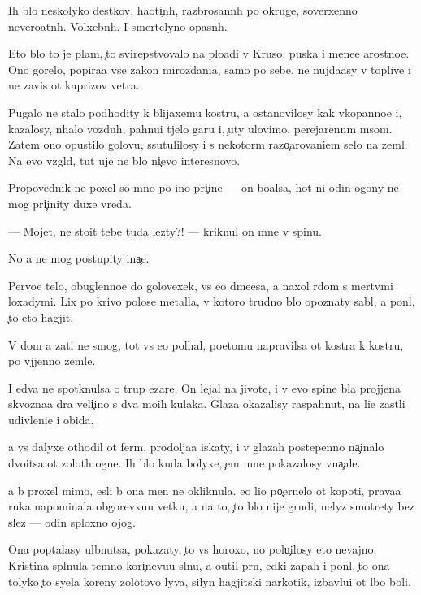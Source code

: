 \documentclass[10pt]{book}
\begin{document}
Ih b{\yi}lo neskolyko des{\ia}tkov, haoti{\c}n{\yi}h, razbrosann{\yi}h po okruge, soverxenno nevero{\y}atn{\yi}h. Volxebn{\yi}h. I smertelyno opasn{\yi}h.

Eto b{\yi}lo to je plam{\ia}, {\c}to svirepstvovalo na plo{\x}adi v Kruso, puska{\y} i mene{\y}e {\y}arostno{\y}e. Ono gorelo, popira{\y}a vse zakon{\yi} mirozdani{\y}a, samo po sebe, ne nujda{\y}asy v toplive i ne zavis{\ia} ot kaprizov vetra.

Pugalo ne stalo podhodity k blija{\y}xemu kostru, a ostanovilosy kak vkopanno{\y}e i, kazalosy, n{\iu}halo vozduh, pahnu{\x}i{\y} t{\ia}jelo{\y} gar{\y}u i, {\c}uty ulovimo, perejarenn{\yi}m m{\ia}som. Zatem ono opustilo golovu, ssutulilosy i s nekotor{\yi}m razo{\c}arovani{\y}em selo na zeml{\iu}. Na {\y}evo vzgl{\ia}d, tut uje ne b{\yi}lo ni{\c}evo interesnovo.

Propovednik ne poxel so mno{\y} po ino{\y} pri{\c}ine — on bo{\y}alsa, hot{\ia} ni odin ogony ne mog pri{\c}inity duxe vreda.

— Mojet, ne sto{\y}it tebe tuda lezty?! — kriknul on mne v spinu.

No {\y}a ne mog postupity ina{\c}e.

Pervo{\y}e telo, obuglenno{\y}e do golovexek, vs{\e} {\y}e{\x}o d{\yi}m{\ia}{\x}e{\y}esa, {\y}a naxol r{\ia}dom s mertv{\yi}mi loxadymi. Lix po krivo{\y} polose metalla, v kotoro{\y} trudno b{\yi}lo opoznaty sabl{\iu}, {\y}a pon{\ia}l, {\c}to eto hagjit.

V dom {\y}a za{\y}ti ne smog, tot vs{\e} {\y}e{\x}o pol{\yi}hal, poetomu napravilsa ot kostra k kostru, po v{\yi}jjenno{\y} zemle.

I {\y}edva ne spotknulsa o trup {\C}ezare. On lejal na jivote, i v {\y}evo spine b{\yi}la projjena skvozna{\y}a d{\yi}ra veli{\c}ino{\y} s dva mo{\y}ih kulaka. Glaza okazalisy raspahnut{\yi}, na li{\q}e zast{\yi}li udivleni{\y}e i obida.

{\Y}a vs{\e} dalyxe othodil ot ferm{\yi}, prodolja{\y}a iskaty, i v glazah postepenno na{\c}inalo dvo{\y}itsa ot zolot{\yi}h ogne{\y}. Ih b{\yi}lo kuda bolyxe, {\c}em mne pokazalosy vna{\c}ale.

{\Y}a b{\yi} proxel mimo, {\y}esli b{\yi} ona men{\ia} ne okliknula. {\y}e{\y}o li{\q}o po{\c}ernelo ot kopoti, prava{\y}a ruka napominala obgorevxu{\y}u vetku, a na to, {\c}to b{\yi}lo nije grudi, nelyz{\ia} smotrety bez slez — odin sploxno{\y} ojog.

Ona pop{\yi}talasy ul{\yi}bnutsa, pokazaty, {\c}to vs{\e} horoxo, no polu{\c}ilosy eto nevajno. Kristina spl{\iu}nula temno-kori{\c}nevu{\y}u sl{\iu}nu, {\y}a o{\x}util pr{\ia}n{\yi}{\y}, {\y}edki{\y} zapah i pon{\ia}l, {\c}to ona tolyko {\c}to syela koreny zolotovo lyva, silyn{\yi}{\y} hagjitski{\y} narkotik, izbavl{\ia}{\y}u{\x}i{\y} ot l{\iu}bo{\y} boli.
\end{document}
